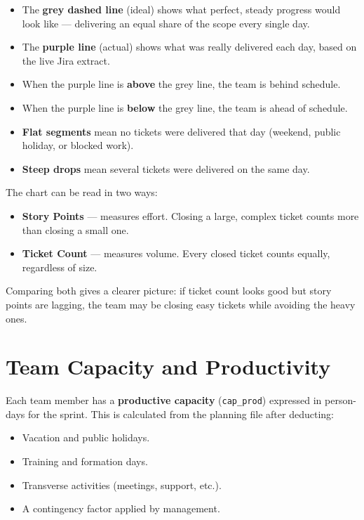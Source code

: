 \documentclass[12pt, a4paper]{article}
\begin{document}
\begin{itemize}
  \item The \textbf{grey dashed line} (ideal) shows what perfect, steady
        progress would look like --- delivering an equal share of the scope
        every single day.

  \item The \textbf{purple line} (actual) shows what was really delivered
        each day, based on the live Jira extract.

  \item When the purple line is \textbf{above} the grey line, the team is
        behind schedule.

  \item When the purple line is \textbf{below} the grey line, the team is
        ahead of schedule.

  \item \textbf{Flat segments} mean no tickets were delivered that day
        (weekend, public holiday, or blocked work).

  \item \textbf{Steep drops} mean several tickets were delivered on the
        same day.
\end{itemize}

The chart can be read in two ways:
\begin{itemize}
  \item \textbf{Story Points} --- measures effort. Closing a large,
        complex ticket counts more than closing a small one.
  \item \textbf{Ticket Count} --- measures volume. Every closed ticket
        counts equally, regardless of size.
\end{itemize}

Comparing both gives a clearer picture: if ticket count looks good but
story points are lagging, the team may be closing easy tickets while
avoiding the heavy ones.

\section{Team Capacity and Productivity}

Each team member has a \textbf{productive capacity} (\texttt{cap\_prod})
expressed in person-days for the sprint. This is calculated from the
planning file after deducting:

\begin{itemize}
  \item Vacation and public holidays.
  \item Training and formation days.
  \item Transverse activities (meetings, support, etc.).
  \item A contingency factor applied by management.
\end{itemize}
\end{document}
